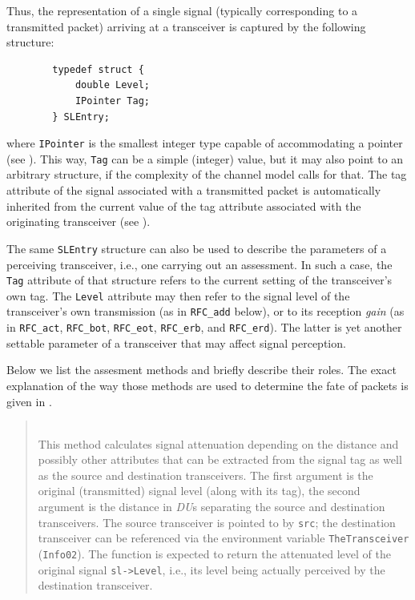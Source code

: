 Thus, the representation of a single signal (typically corresponding to a
transmitted packet) arriving at a transceiver is captured by the
following structure:
\begin{verbatim}
        typedef struct {
            double Level;
            IPointer Tag;
        } SLEntry;
\end{verbatim}
\noindent
where {\tt IPointer} is the smallest integer type capable of accommodating
a pointer (see ).
This way, {\tt Tag\/} can be a simple (integer) value, but it may also
point to an arbitrary structure, if the complexity
of the channel model calls for that.
The tag attribute of the signal associated with a transmitted packet is
automatically inherited from the current value of the tag attribute
associated with the originating transceiver (see ).

The same {\tt SLEntry} structure can also be used to describe the parameters
of a perceiving transceiver, i.e., one carrying out an assessment.
In such a case, the {\tt Tag} attribute of that structure refers to the
current setting of the transceiver's own tag.
The {\tt Level} attribute may then refer to the signal level of the
transceiver's own transmission (as in {\tt RFC\_add} below), or to its
reception
{\em gain\/} (as in {\tt RFC\_act}, {\tt RFC\_bot}, {\tt RFC\_eot},
{\tt RFC\_erb}, and {\tt RFC\_erd}).
The latter is yet another settable parameter of a transceiver that may
affect signal perception.

Below we list the assesment methods and briefly describe their roles.
The exact explanation of the way those methods are used to determine the
fate of packets is given in .

\medskip

\begin{quote}
\noindent{} \hspace{0in}\vspace{0.05in}\\
\noindent
This method calculates signal attenuation depending on the distance and
possibly other attributes that can be extracted from the signal tag as well as
the source and destination transceivers.
The first argument is the original (transmitted) signal level (along with its
tag), the second
argument is the distance in {\em DU\/}s separating the source and destination
transceivers.
The source transceiver is pointed to by
{\tt src}; the destination transceiver can be referenced via the environment
variable {\tt TheTransceiver} ({\tt Info02}).
The function is expected to return
the attenuated level of the original signal {\tt sl->Level},
i.e., its level being actually perceived by the destination transceiver.
\end{quote}

